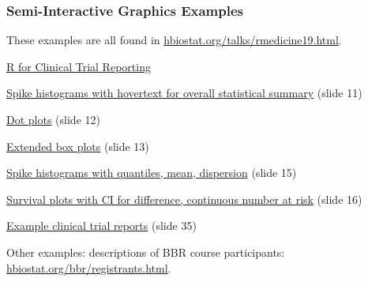 \subsubsection{Semi-Interactive Graphics Examples}

These examples are all found in \url{hbiostat.org/talks/rmedicine19.html}.

\bi
\item \href{https://hbiostat.org/talks/rmedicine19.html}{R for
  Clinical Trial Reporting}
\item \href{https://hbiostat.org/talks/rmedicine19.html#11}{Spike
  histograms with hovertext for overall statistical summary} (slide 11)
\item \href{https://hbiostat.org/talks/rmedicine19.html#12}{Dot plots}
  (slide 12)
\item \href{https://hbiostat.org/talks/rmedicine19.html#13}{Extended
  box plots} (slide 13)
\item \href{https://hbiostat.org/talks/rmedicine19.html#15}{Spike
  histograms with quantiles, mean, dispersion} (slide 15)
\item \href{https://hbiostat.org/talks/rmedicine19.html#16}{Survival
  plots with CI for difference, continuous number at risk} (slide 16)
\item \href{https://hbiostat.org/talks/rmedicine19.html#35}{Example
  clinical trial reports} (slide 35)
\ei

Other examples: descriptions of BBR course participants: \href{https://hbiostat.org/bbr/registrants.html}{hbiostat.org/bbr/registrants.html}.


